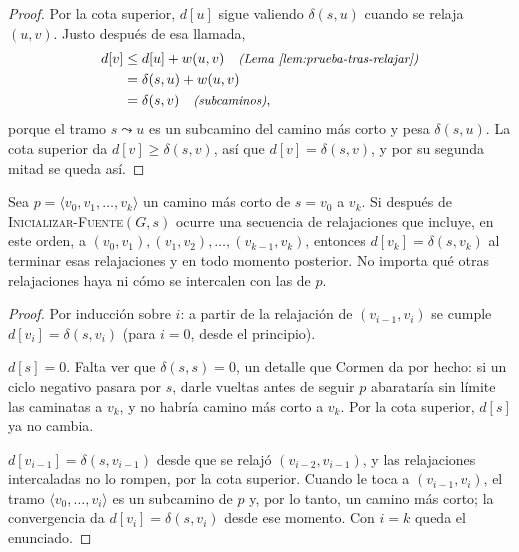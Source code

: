 \documentclass[11pt,letterpaper]{article}
\begin{document}
\begin{proof}
  Por la cota superior, $d[u]$ sigue valiendo $\delta(s, u)$ cuando se
  relaja $(u, v)$. Justo después de esa llamada,
  \begin{align*}
    d[v] &\le d[u] + w(u, v)
           \quad\text{\small\itshape (Lema \ref{lem:prueba-tras-relajar})} \\
         &= \delta(s, u) + w(u, v) \\
         &= \delta(s, v) \quad\text{\small\itshape (subcaminos)} ,
  \end{align*}
  porque el tramo $s \leadsto u$ es un subcamino del camino más corto
  y pesa $\delta(s, u)$. La cota superior da $d[v] \ge \delta(s, v)$,
  así que $d[v] = \delta(s, v)$, y por su segunda mitad se queda así.
\end{proof}

\begin{lema}
  \label{lem:prueba-relajacion-caminos}
  Sea $p = \langle v_0, v_1, \dots, v_k \rangle$ un camino más corto
  de $s = v_0$ a $v_k$. Si después de
  \textsc{Inicializar-Fuente}$(G, s)$ ocurre una secuencia de
  relajaciones que incluye, en este orden, a
  $(v_0, v_1), (v_1, v_2), \dots, (v_{k-1}, v_k)$, entonces
  $d[v_k] = \delta(s, v_k)$ al terminar esas relajaciones y en todo
  momento posterior. No importa qué otras relajaciones haya ni cómo
  se intercalen con las de $p$.
\end{lema}

\begin{proof}
  Por inducción sobre $i$: a partir de la relajación de
  $(v_{i-1}, v_i)$ se cumple $d[v_i] = \delta(s, v_i)$ (para $i = 0$,
  desde el principio).

   $d[s] = 0$. Falta ver que
  $\delta(s, s) = 0$, un detalle que Cormen da por hecho: si un ciclo
  negativo pasara por $s$, darle vueltas antes de seguir $p$
  abarataría sin límite las caminatas a $v_k$, y no habría camino más
  corto a $v_k$. Por la cota superior, $d[s]$ ya no cambia.

   $d[v_{i-1}] = \delta(s, v_{i-1})$ desde que se
  relajó $(v_{i-2}, v_{i-1})$, y las relajaciones intercaladas no lo
  rompen, por la cota superior. Cuando le toca a $(v_{i-1}, v_i)$, el
  tramo $\langle v_0, \dots, v_i \rangle$ es un subcamino de $p$ y,
  por lo tanto, un camino más corto; la convergencia da
  $d[v_i] = \delta(s, v_i)$ desde ese momento. Con $i = k$ queda el
  enunciado.
\end{proof}
\end{document}
